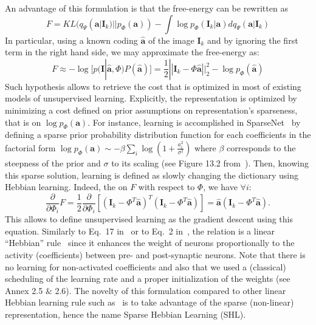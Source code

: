 \documentclass[draft]{article} %
\newcommand{\coef}{\mathbf{a}} %
\newcommand{\image}{\mathbf{I}} %
\newcommand{\dico}{\Phi} %
\newcommand{\norm}[1]{|\!| #1 |\!|}
\begin{document}
An advantage of this formulation is that the free-energy can be rewritten as
\begin{equation} F = KL( q_\Psi(\coef | \image_k) || p_\dico(\coef) ) - \int \log p_\dico(\image_k | \coef ) dq_\Psi(\coef | \image_k) \end{equation}
In particular, using a known coding $\hat{\coef}$ of the image $\image_k$ and by ignoring the first term in the right hand side, we may approximate the free-energy as:
\begin{equation} F \approx - \log [ p(\image | \hat{\coef}, \dico ) P(\hat{\coef}) ] = \frac{1}{2} \norm{\image_k - \dico \hat{\coef}}_2^2 - \log p_\dico(\hat{\coef}) \label{eq:sparse_cost} \end{equation}
Such hypothesis allows to retrieve the cost that is optimized in most of existing models of unsupervised learning. Explicitly, the representation is optimized by minimizing a cost defined on prior assumptions on representation's sparseness, that is on $\log p_\dico( \coef )$. For instance, learning is accomplished in {\sc SparseNet}~\citep{Olshausen97} by defining a sparse prior probability distribution function for each coefficients in the factorial form $\log p_\dico(\coef) \sim -\beta \sum_i \log ( 1 + \frac{a_i^2}{\sigma^2} )$ where $\beta$ corresponds to the steepness of the prior and $\sigma$ to its scaling (see Figure 13.2 from~\citep{Olshausen02}). Then, knowing this sparse solution, learning is defined as slowly changing the dictionary using Hebbian learning.
Indeed, the on $F$ with respect to $\dico$, we have $\forall i$:
\begin{equation} \frac{\partial }{\partial \dico_i } F = \frac{1}{2} \frac{\partial }{\partial \dico_i }[(\image_k - \dico^T \hat{\coef})^T (\image_k - \dico^T \hat{\coef})] = \hat{\coef} (\image_k - \dico^T \hat{\coef}).\end{equation}
This allows to define unsupervised learning as the gradient descent using this equation. Similarly to Eq.~17 in~\citep{Olshausen97} or to Eq.~2 in~\citep{Smith06}, the relation is a linear ``Hebbian'' rule~\citep{Hebb49} since it enhances the weight of neurons proportionally to the activity (coefficients) between pre- and post-synaptic neurons. Note that there is no learning for non-activated coefficients and also that we used a (classical) scheduling of the learning rate and a proper initialization of the weights (see Annex 2.5 \& 2.6). The novelty of this formulation compared to other linear Hebbian learning rule such as~\citep{Oja82} is to take advantage of the sparse (non-linear) representation, hence the name Sparse Hebbian Learning (SHL).
\end{document}

